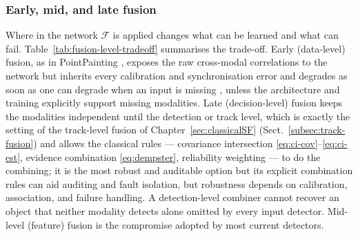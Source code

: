 \documentclass[graybox,envcountchap]{style/SNmono}
\providecommand{\DIFadd}[1]{{\protect\color{blue} #1}} %
\providecommand{\DIFdel}[1]{{\protect\color{red} #1}} %
\providecommand{\DIFaddbegin}{} %
\providecommand{\DIFaddend}{} %
\providecommand{\DIFdelbegin}{} %
\providecommand{\DIFdelend}{} %
\begin{document}
\subsubsection*{Early, mid, and late fusion}
Where in the network $\mathcal{F}$ is applied changes what can be learned and what can fail. Table~\ref{tab:fusion-level-tradeoff} summarises the trade-off. Early (data-level) fusion, as in PointPainting \cite{vora2020_pointpainting}, exposes the raw cross-modal correlations to the network but inherits every calibration and synchronisation error and \DIFdelbegin \DIFdel{degrades as soon as one }\DIFdelend \DIFaddbegin \DIFadd{can degrade when an }\DIFaddend input is missing\DIFaddbegin \DIFadd{, unless the architecture and training explicitly support missing modalities}\DIFaddend . Late (decision-level) fusion keeps the modalities independent until the detection or track level, which is exactly the setting of the track-level fusion of Chapter~\ref{sec:classicalSF} (Sect.~\ref{subsec:track-fusion}) and allows the classical rules --- covariance intersection \eqref{eq:ci-cov}--\eqref{eq:ci-est}, evidence combination \eqref{eq:dempster}, reliability weighting --- to do the combining; \DIFdelbegin \DIFdel{it is the most robust and auditable option but }\DIFdelend \DIFaddbegin \DIFadd{its explicit combination rules can aid auditing and fault isolation, but robustness depends on calibration, association, and failure handling. A detection-level combiner }\DIFaddend cannot recover an object \DIFdelbegin \DIFdel{that neither modality detects alone}\DIFdelend \DIFaddbegin \DIFadd{omitted by every input detector}\DIFaddend . Mid-level (feature) fusion is the compromise adopted by most current detectors.
\end{document}
